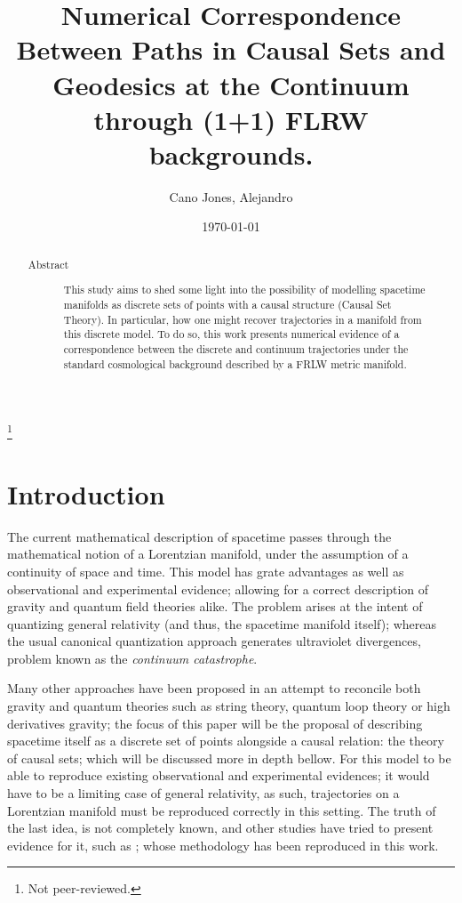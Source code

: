 \documentclass[%
 reprint,
 amsmath,amssymb,
 aps,
]{revtex4-2}
\begin{document}
\title{Numerical Correspondence Between Paths in Causal Sets and Geodesics at the Continuum through (1+1) FLRW backgrounds.}%
\thanks{Not peer-reviewed.}%

\author{Cano Jones, Alejandro}





\date{\today}%

\begin{abstract}
\begin{description}
\item[Abstract]
This study aims to shed some light into the possibility of modelling spacetime manifolds as discrete sets of points with a causal structure (Causal Set Theory). In particular, how one might recover trajectories in a manifold from this discrete model. To do so, this work presents numerical evidence of a correspondence between the discrete and continuum trajectories under the standard cosmological background described by a FRLW metric manifold.
\end{description}
\end{abstract}

\maketitle

\section{Introduction}
The current mathematical description of spacetime passes through the mathematical notion of a Lorentzian manifold, under the assumption of a continuity of space and time. This model has grate advantages as well as observational and experimental evidence; allowing for a correct description of gravity and quantum field theories alike. The problem arises at the intent of quantizing general relativity (and thus, the spacetime manifold itself); whereas the usual canonical quantization approach generates ultraviolet divergences, problem known as the \textit{continuum catastrophe}.

Many other approaches have been proposed in an attempt to reconcile both gravity and quantum theories such as string theory, quantum loop theory or high derivatives gravity; the focus of this paper will be the proposal of describing spacetime itself as a discrete set of points alongside a causal relation: the theory of causal sets; which will be discussed more in depth bellow. For this model to be able to reproduce existing observational and experimental evidences; it would have to be a limiting case of general relativity, as such, trajectories on a Lorentzian manifold must be reproduced correctly in this setting. The truth of the last idea, is not completely known, and other studies have tried to present evidence for it, such as \cite{Original_Idea}; whose methodology has been reproduced in this work.
\end{document}
